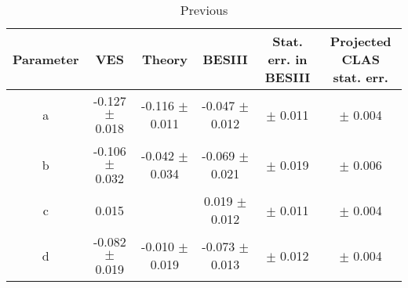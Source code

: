 \begin{table}[h!]
\begin{minipage}{\textwidth}
\begin{center}


\caption{\label{tab:dal.parms}Previous \vspace{0.75mm}}
\begin{tabular}{cccccc}
\hline
Parameter & VES & Theory & BESIII & Stat. err. in BESIII & Projected CLAS stat. err. \\
\hline
a & -0.127 $\pm$ 0.018 & -0.116 $\pm$ 0.011 & -0.047 $\pm$ 0.012 &$\pm$ 0.011&$\pm$ 0.004 \\
b & -0.106 $\pm$ 0.032 & -0.042 $\pm$ 0.034 & -0.069 $\pm$ 0.021 &$\pm$ 0.019&$\pm$ 0.006\\
c & 0.015                        &                                  & 0.019  $\pm$  0.012 &$\pm$ 0.011&$\pm$ 0.004\\
d & -0.082 $\pm$ 0.019 & -0.010 $\pm$ 0.019 & -0.073 $\pm$ 0.013 &$\pm$ 0.012&$\pm$ 0.004\\
\end{tabular}


\end{center}
\end{minipage}
\end{table}
\vspace{20pt}